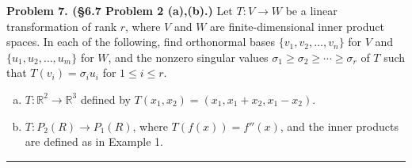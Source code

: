 \documentclass[leqno]{article}
\theoremstyle{nonumberplain}
\newcommand{\R}{\mathbb{R}}
\begin{document}
\pagebreak





\noindent\textbf{Problem 7. (\S 6.7 Problem 2 (a),(b).)} Let $T\colon V\to W$ be a linear transformation of rank $r$, where $V$ and $W$ are finite-dimensional inner product spaces. In each of the following, find orthonormal bases $\{v_1,v_2,\dots,v_n\}$ for $V$ and $\{u_1,u_2,\dots,u_m\}$ for $W$, and the nonzero singular values $\sigma_1\geq \sigma_2 \geq \cdots \geq \sigma_r$ of $T$ such that $T(v_i)=\sigma_i u_i$ for $1\leq i \leq r$.
\begin{enumerate}[(a)]
\item $T\colon \R^2 \to \R^3$ defined by $T(x_1,x_2)=(x_1,x_1+x_2,x_1-x_2)$.
\item $T\colon P_2(R)\to P_1(R)$, where $T(f(x))=f''(x)$, and the inner products are defined as in Example 1.
\end{enumerate}

\noindent\rule[0.5ex]{\linewidth}{1pt}
\end{document}
